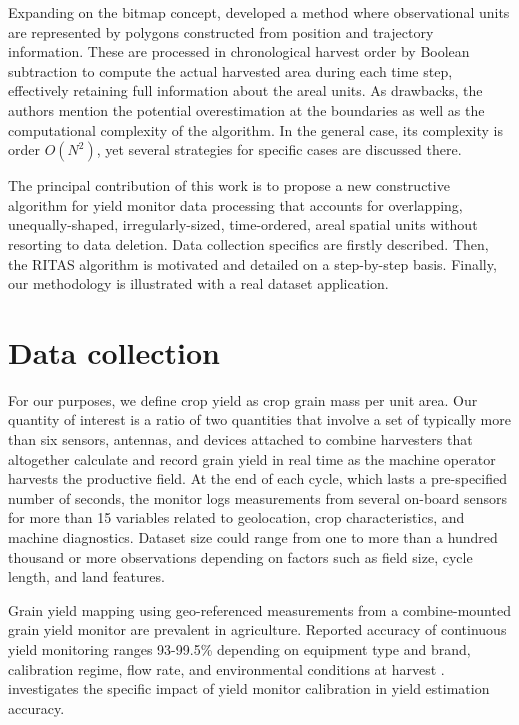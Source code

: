 \documentclass[12pt]{article}
\begin{document}
Expanding on the bitmap concept, \cite{Drummond1999} developed a
method where observational units are represented by polygons
constructed from position and trajectory information. These are
processed in chronological harvest order by Boolean subtraction to
compute the actual harvested area during each time step, effectively
retaining full information about the areal units. As drawbacks, the
authors mention the potential overestimation at the boundaries as well
as the computational complexity of the algorithm. In the general case,
its complexity is order $O(N^2)$, yet several strategies for specific
cases are discussed there.

The principal contribution of this work is to propose a new
constructive algorithm for yield monitor data processing that accounts
for overlapping, unequally-shaped, irregularly-sized, time-ordered,
areal spatial units without resorting to data deletion. Data
collection specifics are firstly described. Then, the RITAS algorithm
is motivated and detailed on a step-by-step basis. Finally, our
methodology is illustrated with a real dataset application.

\section{Data collection}

For our purposes, we define crop yield as crop grain mass per unit
area. Our quantity of interest is a ratio of two quantities that
involve a set of typically more than six sensors, antennas, and
devices attached to combine harvesters that altogether calculate and
record grain yield in real time as the machine operator harvests the
productive field. At the end of each cycle, which lasts a
pre-specified number of seconds, the monitor logs measurements from
several on-board sensors for more than 15 variables related to
geolocation, crop characteristics, and machine diagnostics. Dataset
size could range from one to more than a hundred thousand or more
observations depending on factors such as field size, cycle length,
and land features.

Grain yield mapping using geo-referenced measurements from a
combine-mounted grain yield monitor are prevalent in
agriculture. Reported accuracy of continuous yield monitoring ranges
93-99.5\% depending on equipment type and brand, calibration regime,
flow rate, and environmental conditions at harvest
\citep{birrellComparisonSensorsTechniques1996, Fulton2009,
  Lyle2013}. \cite{Arslan2002} investigates the specific impact of
yield monitor calibration in yield estimation accuracy.
\end{document}
